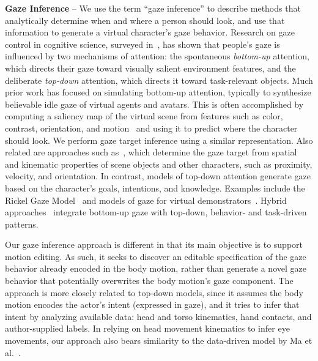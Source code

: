 \noindent\textbf{Gaze Inference} -- We use the term ``gaze inference'' to describe methods that analytically determine when and where a person should look, and use that information to generate a virtual character's gaze behavior. Research on gaze control in cognitive science, surveyed in~\cite{henderson2003human}, has shown that people's gaze is influenced by two mechanisms of attention: the spontaneous \emph{bottom-up} attention, which directs their gaze toward visually salient environment features, and the deliberate \emph{top-down} attention, which directs it toward task-relevant objects. Much prior work has focused on simulating bottom-up attention, typically to synthesize believable idle gaze of virtual agents and avatars. This is often accomplished by computing a saliency map of the virtual scene from features such as color, contrast, orientation, and motion~\cite{peters2003bottomup,peters2008applying} and using it to predict where the character should look. We perform gaze target inference using a similar representation. Also related are approaches such as~\cite{cafaro2009animating,grillon2009crowds,kokkinara2011modelling}, which determine the gaze target from spatial and kinematic properties of scene objects and other characters, such as proximity, velocity, and orientation. In contrast, models of top-down attention generate gaze based on the character's goals, intentions, and knowledge. Examples include the Rickel Gaze Model~\cite{lee2007rickel} and models of gaze for virtual demonstrators~\cite{huang16planning}. Hybrid approaches~\cite{khullar2001look,mitake2007reactive} integrate bottom-up gaze with top-down, behavior- and task-driven patterns.

Our gaze inference approach is different in that its main objective is to support motion editing. As such, it seeks to discover an editable specification of the gaze behavior already encoded in the body motion, rather than generate a novel gaze behavior that potentially overwrites the body motion's gaze component. The approach is more closely related to top-down models, since it assumes the body motion encodes the actor's intent (expressed in gaze), and it tries to infer that intent by analyzing available data: head and torso kinematics, hand contacts, and author-supplied labels. In relying on head movement kinematics to infer eye movements, our approach also bears similarity to the data-driven model by Ma et al.~.

